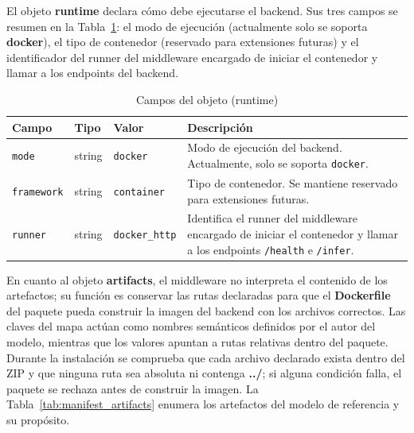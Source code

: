 \documentclass[11pt,a4paper]{article}
\begin{document}
El objeto \textbf{runtime} declara cómo debe ejecutarse el backend. Sus tres campos se resumen en la Tabla~\ref{tab:manifest_runtime}: el modo de ejecución (actualmente solo se soporta \textbf{docker}), el tipo de contenedor (reservado para extensiones futuras) y el identificador del runner del middleware encargado de iniciar el contenedor y llamar a los endpoints del backend.

\begin{table}[H]
\centering
\caption{Campos del objeto (runtime)}
\label{tab:manifest_runtime}
\scriptsize
\renewcommand{\arraystretch}{1.08}
\setlength{\tabcolsep}{3.5pt}

\begin{tabular}{
    >{\raggedright\arraybackslash}p{2.5cm}
    >{\raggedright\arraybackslash}p{1.7cm}
    >{\raggedright\arraybackslash}p{2.7cm}
    >{\raggedright\arraybackslash}p{6.5cm}
}
\toprule
\textbf{Campo} & \textbf{Tipo} & \textbf{Valor} & \textbf{Descripción} \\
\midrule
\texttt{mode} & string & \texttt{docker} & Modo de ejecución del backend. Actualmente, solo se soporta \texttt{docker}. \\
\texttt{framework} & string & \texttt{container} & Tipo de contenedor. Se mantiene reservado para extensiones futuras. \\
\texttt{runner} & string & \texttt{docker\_http} & Identifica el runner del middleware encargado de iniciar el contenedor y llamar a los endpoints \texttt{/health} e \texttt{/infer}. \\
\bottomrule
\end{tabular}
\end{table}

En cuanto al objeto \textbf{artifacts}, el middleware no interpreta el contenido de los artefactos; su función es conservar las rutas declaradas para que el \textbf{Dockerfile} del paquete pueda construir la imagen del backend con los archivos correctos. Las claves del mapa actúan como nombres semánticos definidos por el autor del modelo, mientras que los valores apuntan a rutas relativas dentro del paquete. Durante la instalación se comprueba que cada archivo declarado exista dentro del ZIP y que ninguna ruta sea absoluta ni contenga \textbf{../}; si alguna condición falla, el paquete se rechaza antes de construir la imagen. La Tabla~\ref{tab:manifest_artifacts} enumera los artefactos del modelo de referencia y su propósito.
\end{document}
